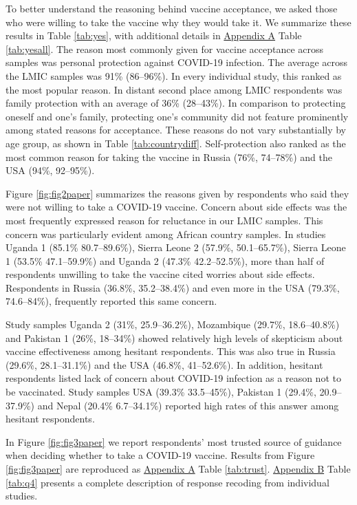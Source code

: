 \documentclass[
  12pt,
]{article}
\begin{document}
To better understand the reasoning behind vaccine acceptance, we asked those who were willing to take the vaccine why they would take it. We summarize these results in Table \ref{tab:yes}, with additional details in \protect\hyperlink{appendixd}{Appendix A} Table \ref{tab:yesall}. The reason most commonly given for vaccine acceptance across samples was personal protection against COVID-19 infection. The average across the LMIC samples was 91\% (86--96\%). In every individual study, this ranked as the most popular reason. In distant second place among LMIC respondents was family protection with an average of 36\% (28--43\%). In comparison to protecting oneself and one's family, protecting one's community did not feature prominently among stated reasons for acceptance. These reasons do not vary substantially by age group, as shown in Table \ref{tab:countrydiff}. Self-protection also ranked as the most common reason for taking the vaccine in Russia (76\%, 74--78\%) and the USA (94\%, 92--95\%).

Figure \ref{fig:fig2paper} summarizes the reasons given by respondents who said they were not willing to take a COVID-19 vaccine. Concern about side effects was the most frequently expressed reason for reluctance in our LMIC samples. This concern was particularly evident among African country samples. In studies Uganda 1 (85.1\% 80.7--89.6\%), Sierra Leone 2 (57.9\%, 50.1--65.7\%), Sierra Leone 1 (53.5\% 47.1--59.9\%) and Uganda 2 (47.3\% 42.2--52.5\%), more than half of respondents unwilling to take the vaccine cited worries about side effects. Respondents in Russia (36.8\%, 35.2--38.4\%) and even more in the USA (79.3\%, 74.6--84\%), frequently reported this same concern.

Study samples Uganda 2 (31\%, 25.9--36.2\%), Mozambique (29.7\%, 18.6--40.8\%) and Pakistan 1 (26\%, 18--34\%) showed relatively high levels of skepticism about vaccine effectiveness among hesitant respondents. This was also true in Russia (29.6\%, 28.1--31.1\%) and the USA (46.8\%, 41--52.6\%). In addition, hesitant respondents listed lack of concern about COVID-19 infection as a reason not to be vaccinated. Study samples USA (39.3\% 33.5--45\%), Pakistan 1 (29.4\%, 20.9--37.9\%) and Nepal (20.4\% 6.7--34.1\%) reported high rates of this answer among hesitant respondents.

In Figure \ref{fig:fig3paper} we report respondents' most trusted source of guidance when deciding whether to take a COVID-19 vaccine. Results from Figure \ref{fig:fig3paper} are reproduced as \protect\hyperlink{appendixd}{Appendix A} Table \ref{tab:trust}. \protect\hyperlink{appendixb}{Appendix B} Table \ref{tab:q4} presents a complete description of response recoding from individual studies.
\end{document}
